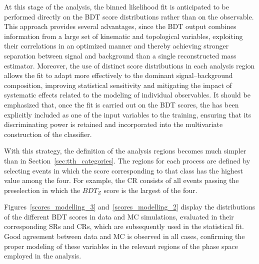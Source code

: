 At this stage of the analysis, the binned likelihood fit is anticipated to be performed directly on the BDT score distributions rather than on the \mmc observable. This approach provides several advantages, since the BDT output combines information from a large set of kinematic and topological variables, exploiting their correlations in an optimized manner and thereby achieving stronger separation between signal and background than a single reconstructed mass estimator. Moreover, the use of distinct score distributions in each analysis region allows the fit to adapt more effectively to the dominant signal–background composition, improving statistical sensitivity and mitigating the impact of systematic effects related to the modeling of individual observables. It should be emphasized that, once the fit is carried out on the BDT scores, the \mmc has been explicitly included as one of the input variables to the training, ensuring that its discriminating power is retained and incorporated into the multivariate construction of the classifier.

With this strategy, the definition of the analysis regions becomes much simpler than in Section~\ref{sec:tth_categories}. The regions for each process are defined by selecting events in which the score corresponding to that class has the highest value among the four. For example, the \ztautau CR consists of all events passing the preselection in which the $BDT_{Z}$ score is the largest of the four.

Figures~\ref{scores_modelling_3} and~\ref{scores_modelling_2} display the distributions of the different BDT scores in data and MC simulations, evaluated in their corresponding SRs and CRs, which are subsequently used in the statistical fit. Good agreement between data and MC is observed in all cases, confirming the proper modeling of these variables in the relevant regions of the phase space employed in the analysis.

